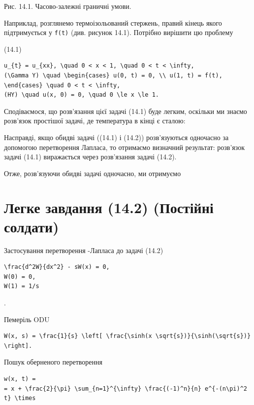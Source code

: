 \documentclass[
  ukrainian,
]{article}
\begin{document}
Рис. 14.1. Часово-залежні граничні умови.

Наприклад, розглянемо термоізольований стержень, правий кінець якого
підтримується у \texttt{f(t)} (див. рисунок 14.1). Потрібно вирішити цю
проблему

(14.1)

\begin{verbatim}
u_{t} = u_{xx}, \quad 0 < x < 1, \quad 0 < t < \infty,
(\Gamma Y) \quad \begin{cases} u(0, t) = 0, \\ u(1, t) = f(t), \end{cases} \quad 0 < t < \infty,
(HY) \quad u(x, 0) = 0, \quad 0 \le x \le 1.
\end{verbatim}

Сподіваємося, що розв'язання цієї задачі (14.1) буде легким, оскільки ми
знаємо розв'язок простішої задачі, де температура в кінці є сталою:

Насправді, якщо обидві задачі ((14.1) і (14.2)) розв'язуються одночасно
за допомогою перетворення Лапласа, то отримаємо визначний результат:
розв'язок задачі (14.1) виражається через розв'язання задачі (14.2).

Отже, розв'язуючи обидві задачі одночасно, ми отримуємо

\section{Легке завдання (14.2) (Постійні
солдати)}\label{ux43bux435ux433ux43aux435-ux437ux430ux432ux434ux430ux43dux43dux44f-14.2-ux43fux43eux441ux442ux456ux439ux43dux456-ux441ux43eux43bux434ux430ux442ux438}

Застосування перетворення -Лапласа до задачі (14.2)

\begin{verbatim}
\frac{d^2W}{dx^2} - sW(x) = 0,
W(0) = 0,
W(1) = 1/s
\end{verbatim}

.

Пемеріль ODU

\begin{verbatim}
W(x, s) = \frac{1}{s} \left[ \frac{\sinh(x \sqrt{s})}{\sinh(\sqrt{s})} \right].
\end{verbatim}

Пошук оберненого перетворення

\begin{verbatim}
w(x, t) =
= x + \frac{2}{\pi} \sum_{n=1}^{\infty} \frac{(-1)^n}{n} e^{-(n\pi)^2 t} \times
\end{verbatim}
\end{document}
